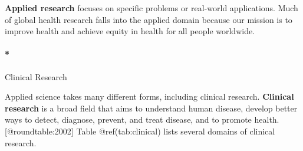 \documentclass[
  letterpaper,
  DIV=11,
  numbers=noendperiod,
  oneside]{scrartcl}
\let\oldparagraph\paragraph
\renewcommand{\paragraph}[1]{\oldparagraph{#1}\mbox{}}
\begin{document}
\textbf{Applied research} focuses on specific problems or real-world
applications. Much of global health research falls into the applied
domain because our mission is to improve health and achieve equity in
health for all people worldwide.

\hypertarget{clinical-research}{%
\paragraph*{Clinical Research}\label{clinical-research}}

Applied science takes many different forms, including clinical research.
\textbf{Clinical research} is a broad field that aims to understand
human disease, develop better ways to detect, diagnose, prevent, and
treat disease, and to promote health.{[}@roundtable:2002{]} Table
@ref(tab:clinical) lists several domains of clinical research.

\vspace{2em}
\end{document}
